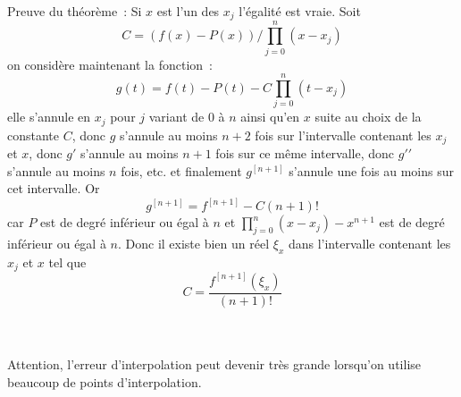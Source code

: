 \documentclass[a4paper,11pt]{book}
\begin{document}
\begin{giacjshere}
Preuve du th\'eor\`eme~: Si $x$ est l'un des $x_j$ l'égalité est vraie. Soit 
\[ C=(f(x)-P(x))/\prod_{j=0}^n(x-x_j) \]
on considère maintenant la fonction~:
\[ g(t)=f(t)-P(t) - C \prod_{j=0}^n(t-x_j) \]
elle s'annule en $x_j$ pour $j$ variant de 0 à $n$ ainsi qu'en $x$
suite au choix de la constante $C$, donc $g$ s'annule au moins $n+2$ fois
sur l'intervalle contenant les $x_j$ et $x$, donc $g'$ s'annule au moins
$n+1$ fois sur ce même intervalle, donc $g'{'}$ s'annule au moins
$n$ fois, etc. et finalement $g^{[n+1]}$ s'annule une fois
au moins sur cet intervalle. Or 
\[ g^{[n+1]} = f^{[n+1]} - C (n+1)!\]
car $P$ est de degré inférieur ou égal à $n$ 
et $ \prod_{j=0}^n(x-x_j) - x^{n+1}$ est de degré
inférieur ou égal à $n$. Donc il existe bien un réel $\xi_x$ dans
l'intervalle contenant les $x_j$ et $x$ tel que
\[ C=\frac{f^{[n+1]}(\xi_x)}{(n+1)!} \]
\\
\\


Attention, l'erreur d'interpolation peut devenir tr\`es grande
lorsqu'on utilise beaucoup de points d'interpolation.



\end{giacjshere}
\end{document}
